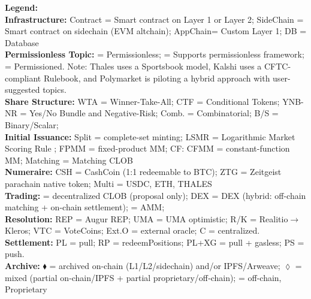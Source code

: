\begin{table}[t!]
\vspace{0.30em}
\begin{minipage}{\textwidth}
\textbf{Legend:} \\
\textbf{Infrastructure:} Contract = Smart contract on Layer 1 or Layer 2; SideChain = Smart contract on sidechain (EVM altchain); AppChain= Custom Layer 1; DB = Database\\
\textbf{Permissionless Topic:} \CIRCLE = Permissionless; \LEFTcircle = Supports permissionless framework; \Circle = Permissioned. Note: Thales uses a Sportsbook model, Kalshi uses a CFTC-compliant Rulebook, and Polymarket is piloting a hybrid approach with user-suggested topics.\\
\textbf{Share Structure:} WTA = Winner-Take-All; CTF = Conditional Tokens; YNB-NR = Yes/No Bundle and Negative-Risk; Comb. = Combinatorial; B/S = Binary/Scalar; \\
\textbf{Initial Issuance:} Split = complete-set minting; LSMR = Logarithmic Market Scoring Rule ; FPMM = fixed-product MM; CF: CFMM = constant-function MM; Matching = Matching CLOB \\
\textbf{Numeraire:} CSH = CashCoin (1:1 redeemable to BTC); ZTG = Zeitgeist parachain native token; Multi = USDC, ETH, THALES \\
\textbf{Trading:} \CIRCLE = decentralized CLOB (proposal only); DEX =  DEX (hybrid: off-chain matching + on-chain settlement); \Circle = AMM;  \\
\textbf{Resolution:} REP = Augur REP; UMA = UMA optimistic; R/K = Realitio$\rightarrow$Kleros; VTC = VoteCoins; Ext.O = external oracle; C = centralized. \\
\textbf{Settlement:} PL = pull; RP = redeemPositions; PL+XG = pull + gasless; PS = push. \\
\textbf{Archive:} $\blacklozenge$ = archived on-chain (L1/L2/sidechain) and/or IPFS/Arweave; $\lozenge$ = mixed (partial on‑chain/IPFS + partial proprietary/off‑chain); \Circle = off-chain, Proprietary\\
\end{minipage}
\end{table} 